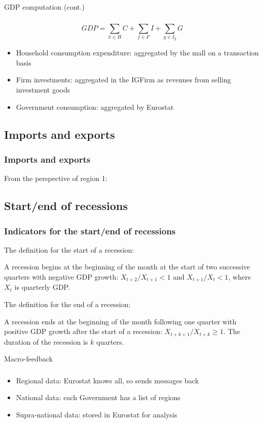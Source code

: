 \documentclass{beamer}
\begin{document}
\begin{frame}{GDP computation (cont.)}
\frametitle{}
\[ GDP = \sum_{h\in H} C + \sum_{f\in F}I + \sum_{g\in I_g}G \]
\begin{itemize}
\item Household consumption expenditure: aggregated by the mall on a transaction basis
\item Firm investments: aggregated in the IGFirm as revenues from selling investment goods
\item Government consumption: aggregated by Eurostat
\end{itemize}
\end{frame}

\subsection{Imports and exports}
\begin{frame}{}
\frametitle{Imports and exports}
From the perspective of region 1:
\begin{figure}[ht!]
\centering\leavevmode
{}
\end{figure}
\end{frame}

\subsection{Start/end of recessions}
\begin{frame}{}
\frametitle{Indicators for the start/end of recessions}
\small
The definition for the start of a recession:
\begin{definition}
A recession begins at the beginning of the month at the start of two successive quarters with negative GDP growth: $X_{t+2}/X_{t+1}<1$ and $X_{t+1}/X_{t}<1$, where $X_{t}$ is quarterly GDP.
\end{definition}

The definition for the end of a recession:
\begin{definition}
A recession ends at the beginning of the month following one quarter with positive GDP growth after the start of a recession: $X_{t+k+1}/X_{t+k}\geq 1$. The duration of the recession is $k$ quarters.
\end{definition}
\end{frame}

\begin{frame}{Macro-feedback}
\frametitle{}
\begin{itemize}
\item Regional data: Eurostat knows all, so sends messages back
\item National data: each Government has a list of regions
\item Supra-national data: stored in Eurostat for analysis
\end{itemize}
\end{frame}
\end{document}
